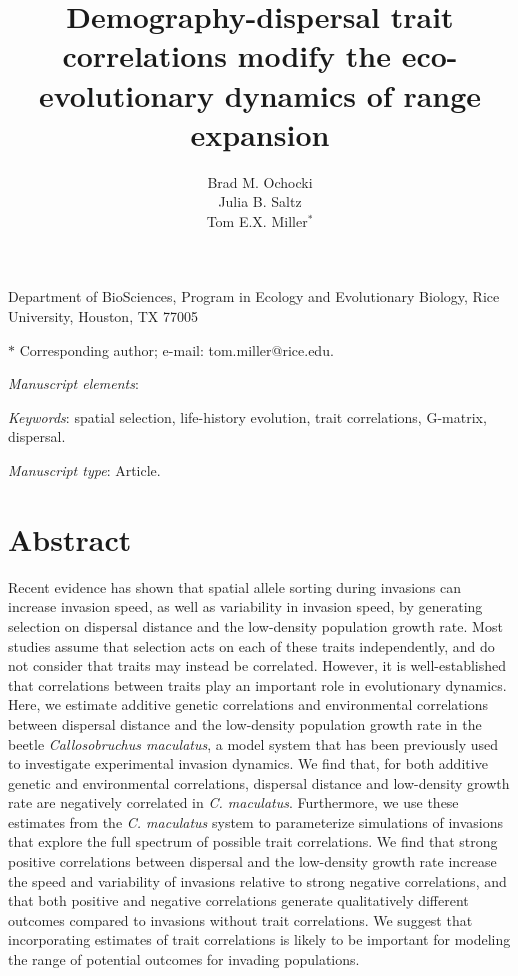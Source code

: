 \documentclass[11pt]{article}
\title{Demography-dispersal trait correlations modify the eco-evolutionary dynamics of range expansion}
\author{Brad M. Ochocki \\
Julia B. Saltz \\
Tom E.X. Miller$^{\ast}$}
\date{}
\newcommand{\tom}[1]{{\textit{\color{WildStrawberry}{[#1]}}}}
\begin{document}
\maketitle

\noindent{} Department of BioSciences, Program in Ecology and Evolutionary Biology, Rice University, Houston, TX 77005

\noindent{} $\ast$ Corresponding author; e-mail: tom.miller@rice.edu.

\bigskip

\textit{Manuscript elements}: %

\bigskip

\textit{Keywords}: spatial selection, life-history evolution, trait correlations, G-matrix, dispersal.

\bigskip

\textit{Manuscript type}: Article.

\bigskip


\linenumbers{}
\modulolinenumbers[3]

\newpage{}

\section*{Abstract}

\tom{Abstract not updated yet.} Recent evidence has shown that spatial allele sorting during invasions can increase invasion speed, as well as variability in invasion speed, by generating selection on dispersal distance and the low-density population growth rate. Most studies assume that selection acts on each of these traits independently, and do not consider that traits may instead be correlated. However, it is well-established that correlations between traits play an important role in evolutionary dynamics. Here, we estimate additive genetic correlations and environmental correlations between dispersal distance and the low-density population growth rate in the beetle \textit{Callosobruchus maculatus}, a model system that has been previously used to investigate experimental invasion dynamics. We find that, for both additive genetic and environmental correlations, dispersal distance and low-density growth rate are negatively correlated in \textit{C. maculatus}. Furthermore, we use these estimates from the \textit{C. maculatus} system to parameterize simulations of invasions that explore the full spectrum of possible trait correlations. We find that strong positive correlations between dispersal and the low-density growth rate increase the speed and variability of invasions relative to strong negative correlations, and that both positive and negative correlations generate qualitatively different outcomes compared to invasions without trait correlations. We suggest that incorporating estimates of trait correlations is likely to be important for modeling the range of potential outcomes for invading populations.
\end{document}
